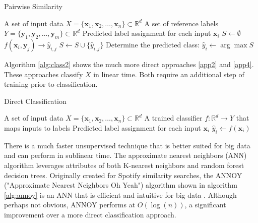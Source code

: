 \documentclass[12pt]{article}
\begin{document}
\begin{algorithm}[hbt!]
\caption{Pairwise Similarity}\label{alg:class1}
\begin{algorithmic}
\Require
\Statex A set of input data \( X = \{ \mathbf{x}_1, \mathbf{x}_2, \dots, \mathbf{x}_n \} \subset \mathbb{R}^d \)
\Statex A set of reference labels \( Y = \{ \mathbf{y}_1, \mathbf{y}_2, \dots, \mathbf{y}_m \} \subset \mathbb{R}^d \)
\Ensure
\Statex Predicted label assignment for each input \( \mathbf{x}_i \)
 
    \State $S \gets \emptyset$ 
     
        \State $ f(\mathbf{x}_i, \mathbf{y}_j) \to \hat{y}_{i,j}$ 
        \State $S            \gets S \cup \{ \hat{y}_{i,j} \} $ 
    \EndFor
    \State Determine the predicted class: $\hat{y}_i \gets \arg\max S $
\EndFor
\end{algorithmic}
\end{algorithm}

Algorithm \ref{alg:class2} shows the much more direct approaches \ref{app2} and \ref{app4}. These approaches classify $X$ in linear time. Both require an additional step of training prior to classification. 

\begin{algorithm}[hbt!]
\caption{Direct Classification}\label{alg:class2}
\begin{algorithmic}
\Require
\Statex A set of input data \( X = \{ \mathbf{x}_1, \mathbf{x}_2, \dots, \mathbf{x}_n \} \subset \mathbb{R}^d \)
\Statex A trained classifier \( f: \mathbb{R}^d \to Y \) that maps inputs to labels
\Ensure
\Statex Predicted label assignment for each input \( \mathbf{x}_i \)
 
    \State $\hat{y}_i \gets f(\mathbf{x}_i)$ 
\EndFor
\end{algorithmic}
\end{algorithm}

There is a much faster unsupervised technique that is better suited for big data and can perform in sublinear time. The approximate nearest neighbors (ANN) algorithm leverages attributes of both K-nearest neighbors and random forest decision trees. Originally created for Spotify similarity searches, the ANNOY ("Approximate Nearest Neighbors Oh Yeah") algorithm shown in algorithm \ref{alg:annoy} is an ANN that is efficient and intuitive for big data \cite{ANNOYBern}. Although perhaps not obvious, ANNOY performs at $O(\log(n))$, a significant improvement over a more direct classification approach. 
\end{document}

